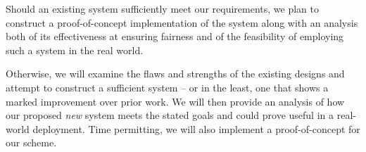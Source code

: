 \documentclass[10pt]{article}
\begin{document}
\begin{multicols}{2}
			Should an existing system sufficiently meet our requirements, we plan to construct a
			proof-of-concept implementation of the system along with an analysis both of its effectiveness
			at ensuring fairness and of the feasibility of employing such a system in the real world.

			Otherwise, we will examine the flaws and strengths of the existing designs and attempt to
			construct a sufficient system -- or in the least, one that shows a marked improvement over
			prior work. We will then provide an analysis of how our proposed \emph{new} system meets the
			stated goals and could prove useful in a real-world deployment. Time permitting, we will also
			implement a proof-of-concept for our scheme.

	\end{multicols}

	{}
	
\end{document}
